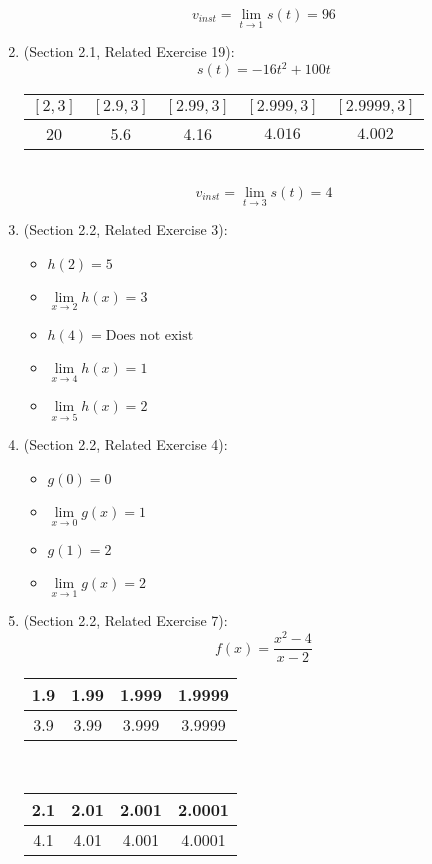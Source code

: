 \documentclass{article}
\begin{document}
\begin{enumerate}
    	$$v_{inst} = \lim_{t \to 1}{s(t)} = 96$$
    \item (Section 2.1, Related Exercise 19):
	    $$s(t) = -16t^2 + 100t$$
    
	    \begin{tabular}{| c | c | c | c | c |}
            \hline
	        $[2,3]$&$[2.9,3]$&$[2.99,3]$&$[2.999,3]$&$[2.9999,3]$ \\
            \hline
	        20 & 5.6 & 4.16 & $4.016$ & $4.002$ \\
            \hline
        \end{tabular} \\
    
	    $$v_{inst} = \lim_{t \to 3}{s(t)} = 4$$
    \item (Section 2.2, Related Exercise 3):
        \begin{itemize}
		    \item $h(2) = 5$
		    \item $\lim\limits_{x \to 2}{h(x)} = 3$
		    \item $h(4) = \text{Does not exist}$
		    \item $\lim\limits_{x \to 4}{h(x)} = 1$
		    \item $\lim\limits_{x \to 5}{h(x)} = 2$
        \end{itemize}
    \item (Section 2.2, Related Exercise 4):
        \begin{itemize}
		    \item $g(0) = 0$
		    \item $\lim\limits_{x \to 0}{g(x)} = 1$
		    \item $g(1) = 2$
		    \item $\lim\limits_{x \to 1}{g(x)} = 2$
        \end{itemize}
    \item (Section 2.2, Related Exercise 7):
	    $$f(x) = \frac{x^2 - 4}{x - 2}$$
    
	    \begin{tabular}{| c | c | c | c |}
            \hline
	        1.9 & 1.99 & 1.999 & 1.9999 \\
            \hline
	        3.9 & 3.99 & 3.999 & 3.9999 \\
            \hline
        \end{tabular} \\
    
	    \begin{tabular}{| c | c | c | c |}
            \hline
	        2.1 & 2.01 & 2.001 & 2.0001 \\
            \hline
	        4.1 & 4.01 & 4.001 & 4.0001 \\
            \hline
        \end{tabular} \\
    

\end{enumerate}
\end{document}

